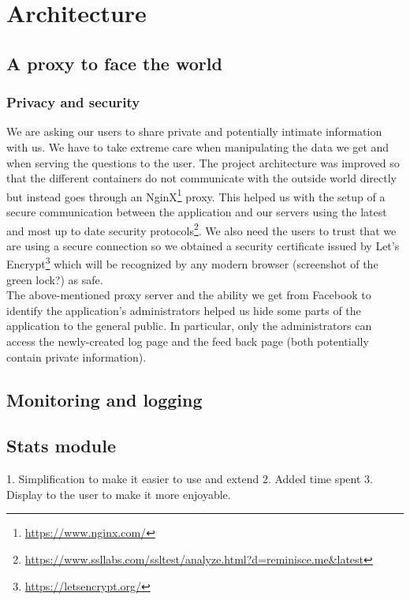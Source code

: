 \chapter{Architecture}
\section{A proxy to face the world}
\subsection{Privacy and security}
We are asking our users to share private and potentially intimate information with us. We have to take extreme care when manipulating the data we get and when serving the questions to the user. The project architecture was improved so that the different containers do not communicate with the outside world directly but instead goes through an NginX\footnote{\url{https://www.nginx.com/}} proxy. This helped us with the setup of a secure communication between the application and our servers using the latest and most up to date security protocols\footnote{\url{https://www.ssllabs.com/ssltest/analyze.html?d=reminisce.me&latest}}. We also need the users to trust that we are using a secure connection so we obtained a security certificate issued by Let's Encrypt\footnote{\url{https://letsencrypt.org/}} which will be recognized by any modern browser (screenshot of the green lock?) as safe.\\
The above-mentioned proxy server and the ability we get from Facebook to identify the application's administrators helped us hide some parts of the application to the general public. In particular, only the administrators can access the newly-created log page and the feed back page (both potentially contain private information).
\section{Monitoring and logging}
\section{Stats module}

1. Simplification to make it easier to use and extend
2. Added time spent
3. Display to the user to make it more enjoyable.